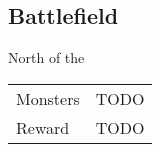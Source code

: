 \subsection{Battlefield}
\label{map:battlefield_10}

North of the 

\begin{longtable}{ l p{9cm} }
	Monsters
	& TODO
\\
	Reward & TODO
\end{longtable}
